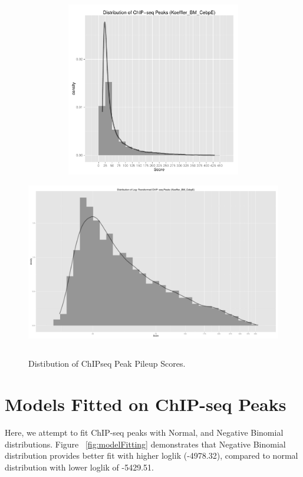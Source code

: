 \documentclass{article}\usepackage[]{graphicx}\usepackage[]{color}
\begin{document}
\clearpage
\begin{figure}[!htbp]
    \includegraphics[width=6in, height=3in]{figs/Koeffler_BM_CebpE_CountChipSeqPeaks.pdf}
    \\
    \includegraphics[width=6in, height=3in]{figs/Koeffler_BM_CebpE_CountChipSeqPeaks_log.pdf}
    \caption{Distibution of ChIPseq Peak Pileup Scores.}
    \label{fig:DistributionChipPeak}
\end{figure}
\clearpage

\section{Models Fitted on ChIP-seq Peaks}
Here, we attempt to fit ChIP-seq peaks with Normal, and Negative Binomial distributions. 
Figure ~\ref{fig:modelFitting} demonstrates that Negative Binomial distribution provides better fit with higher loglik (-4978.32), compared to normal distribution with lower loglik of -5429.51.   
\end{document}
